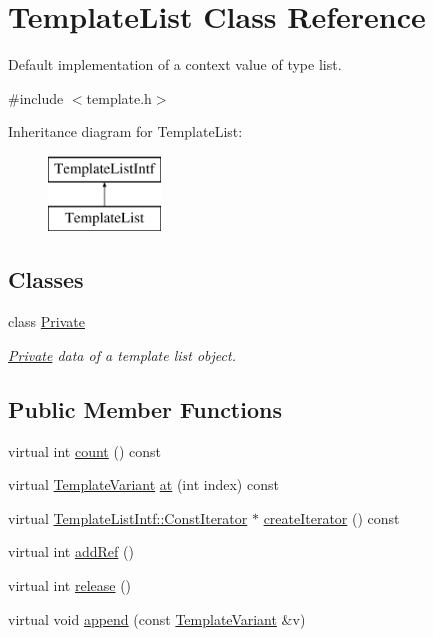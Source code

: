 \hypertarget{class_template_list}{}\section{Template\+List Class Reference}
\label{class_template_list}


Default implementation of a context value of type list.  




{\ttfamily \#include $<$template.\+h$>$}

Inheritance diagram for Template\+List\+:\begin{figure}[H]
\begin{center}
\leavevmode
\includegraphics[height=2.000000cm]{class_template_list}
\end{center}
\end{figure}
\subsection*{Classes}
\begin{DoxyCompactItemize}
\item 
class \mbox{\hyperlink{class_template_list_1_1_private}{Private}}
\begin{DoxyCompactList}\small\item\em \mbox{\hyperlink{class_template_list_1_1_private}{Private}} data of a template list object. \end{DoxyCompactList}\end{DoxyCompactItemize}
\subsection*{Public Member Functions}
\begin{DoxyCompactItemize}
\item 
virtual int \mbox{\hyperlink{class_template_list_a30e405b8e59795bd9e9f2fa2b36b6bd0}{count}} () const
\item 
virtual \mbox{\hyperlink{class_template_variant}{Template\+Variant}} \mbox{\hyperlink{class_template_list_a9fffa09b83138d64bbe66b32e2a3d283}{at}} (int index) const
\item 
virtual \mbox{\hyperlink{class_template_list_intf_1_1_const_iterator}{Template\+List\+Intf\+::\+Const\+Iterator}} $\ast$ \mbox{\hyperlink{class_template_list_aeadbcac8450e3822ef3beec0983a2a55}{create\+Iterator}} () const
\item 
virtual int \mbox{\hyperlink{class_template_list_a144bf4bdc326ba570eba62b1dc90f32f}{add\+Ref}} ()
\item 
virtual int \mbox{\hyperlink{class_template_list_aeff3b4d0cf58bc2bd92de00c51cde488}{release}} ()
\item 
virtual void \mbox{\hyperlink{class_template_list_ad866913882089b08eb818f801c251aed}{append}} (const \mbox{\hyperlink{class_template_variant}{Template\+Variant}} \&v)
\end{DoxyCompactItemize}

